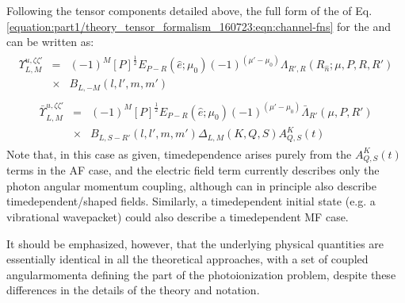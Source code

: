 \documentclass[letterpaper,table,10pt,english]{jupyterBook}
\begin{document}
\sphinxAtStartPar
Following the tensor components detailed above, the full form of the {\hyperref[\detokenize{backmatter/glossary:term-channel-functions}]{}} of Eq. \eqref{equation:part1/theory_tensor_formalism_160723:eqn:channel-fns} for the {\hyperref[\detokenize{backmatter/glossary:term-AF}]{}} and {\hyperref[\detokenize{backmatter/glossary:term-MF}]{}} can be written as:
\begin{equation}\label{equation:part1/theory_tensor_formalism_160723:eq:channelFunc-MF-defn}
\begin{split}
\begin{aligned}
\varUpsilon_{L,M}^{u,\zeta\zeta'} & = & (-1)^{M}{[P]^{\frac{1}{2}}}E_{P-R}(\hat{e};\mu_{0})(-1)^{(\mu'-\mu_{0})}\Lambda_{R',R}(R_{\hat{n}};\mu,P,R,R')\\
 & \times & B_{L,-M}(l,l',m,m')\end{aligned}
\end{split}
\end{equation}\begin{equation}\label{equation:part1/theory_tensor_formalism_160723:eq:channelFunc-AF-defn}
\begin{split}
\begin{aligned}
\bar{\varUpsilon_{}}_{L,M}^{u,\zeta\zeta'} & = & (-1)^{M}[P]^{\frac{1}{2}}E_{P-R}(\hat{e};\mu_{0})(-1)^{(\mu'-\mu_{0})}\bar{\Lambda}_{R'}(\mu,P,R')\\
 & \times & B_{L,S-R'}(l,l',m,m')\Delta_{L,M}(K,Q,S)A_{Q,S}^{K}(t)\end{aligned}
\end{split}
\end{equation}
\sphinxAtStartPar
Note that, in this case as given, time\sphinxhyphen{}dependence arises purely from the
\(A_{Q,S}^{K}(t)\) terms in the AF case, and the electric field term
currently describes only the photon angular momentum coupling, although
can in principle also describe time\sphinxhyphen{}dependent/shaped fields. Similarly,
a time\sphinxhyphen{}dependent initial state (e.g. a vibrational wavepacket) could
also describe a time\sphinxhyphen{}dependent MF case.

\sphinxAtStartPar
It should be emphasized, however, that the underlying physical
quantities are essentially identical in all the theoretical approaches,
with a set of coupled angular\sphinxhyphen{}momenta defining the {\hyperref[\detokenize{backmatter/glossary:term-geometric-coupling-parameters}]{}} part of
the photoionization problem, despite these differences in the details of
the theory and notation.
\end{document}

